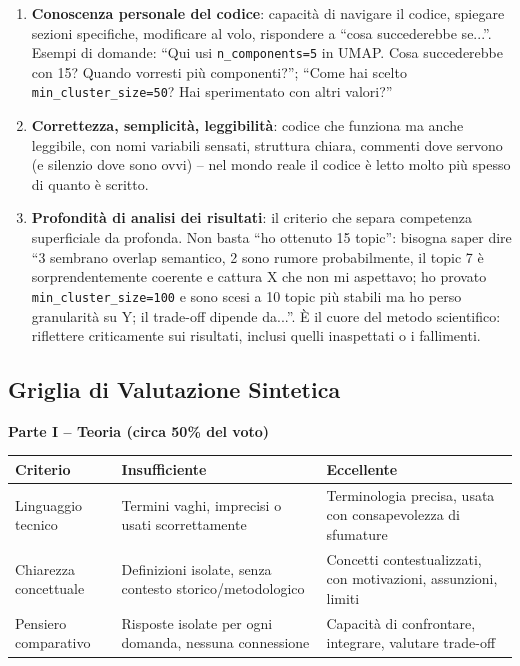 \documentclass[12pt,a4paper]{article}
\begin{document}
\begin{enumerate}
  \item \textbf{Conoscenza personale del codice}: capacit\`a di navigare il codice, spiegare sezioni specifiche, modificare al volo, rispondere a ``cosa succederebbe se...''. Esempi di domande: ``Qui usi \texttt{n\_components=5} in UMAP. Cosa succederebbe con 15? Quando vorresti pi\`u componenti?''; ``Come hai scelto \texttt{min\_cluster\_size=50}? Hai sperimentato con altri valori?''
  \item \textbf{Correttezza, semplicit\`a, leggibilit\`a}: codice che funziona ma anche leggibile, con nomi variabili sensati, struttura chiara, commenti dove servono (e silenzio dove sono ovvi) -- nel mondo reale il codice \`e letto molto pi\`u spesso di quanto \`e scritto.
  \item \textbf{Profondit\`a di analisi dei risultati}: il criterio che separa competenza superficiale da profonda. Non basta ``ho ottenuto 15 topic'': bisogna saper dire ``3 sembrano overlap semantico, 2 sono rumore probabilmente, il topic 7 \`e sorprendentemente coerente e cattura X che non mi aspettavo; ho provato \texttt{min\_cluster\_size=100} e sono scesi a 10 topic pi\`u stabili ma ho perso granularit\`a su Y; il trade-off dipende da...''. \`E il cuore del metodo scientifico: riflettere criticamente sui risultati, inclusi quelli inaspettati o i fallimenti.
\end{enumerate}

\subsection{Griglia di Valutazione Sintetica}

\begin{resultbox}
\textbf{Parte I -- Teoria (circa 50\% del voto)}
\begin{center}
\small
\begin{tabular}{lL{4.9cm}L{4.9cm}}
\toprule
\textbf{Criterio} & \textbf{Insufficiente} & \textbf{Eccellente} \\
\midrule
Linguaggio tecnico & Termini vaghi, imprecisi o usati scorrettamente & Terminologia precisa, usata con consapevolezza di sfumature \\
Chiarezza concettuale & Definizioni isolate, senza contesto storico/metodologico & Concetti contestualizzati, con motivazioni, assunzioni, limiti \\
Pensiero comparativo & Risposte isolate per ogni domanda, nessuna connessione & Capacit\`a di confrontare, integrare, valutare trade-off \\
\bottomrule
\end{tabular}
\end{center}
\end{resultbox}
\end{document}

